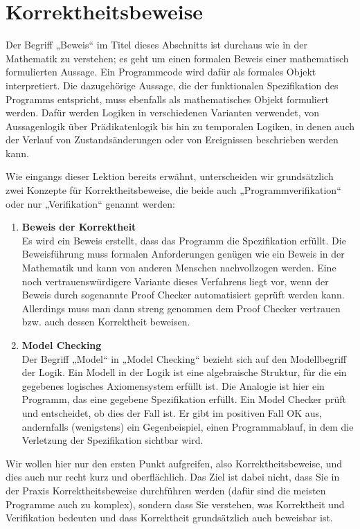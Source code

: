 \section{Korrektheitsbeweise}
\label{sec:Kap-11-2}

Der Begriff „Beweis“ im Titel dieses Abschnitts ist durchaus wie in der Mathematik zu verstehen; es geht um einen formalen Beweis einer mathematisch formulierten Aussage. Ein Programmcode wird dafür als formales Objekt interpretiert. Die dazugehörige Aussage, die der funktionalen Spezifikation des Programms entspricht, muss ebenfalls als mathematisches Objekt formuliert werden. Dafür werden Logiken in verschiedenen Varianten verwendet, von Aussagenlogik über Prädikatenlogik bis hin zu temporalen Logiken, in denen auch der Verlauf von Zustandsänderungen oder von Ereignissen beschrieben werden kann.

Wie eingangs dieser Lektion bereits erwähnt, unterscheiden wir grundsätzlich zwei Konzepte für Korrektheitsbeweise, die beide auch „Programmverifikation“ oder nur „Verifikation“ genannt werden:

\begin{enumerate}
	\item \textbf{Beweis der Korrektheit}\\
	Es wird ein Beweis erstellt, dass das Programm die Spezifikation erfüllt. Die Beweisführung muss formalen Anforderungen genügen wie ein Beweis in der Mathematik und kann von anderen Menschen nachvollzogen werden. Eine noch vertrauenswürdigere Variante dieses Verfahrens liegt vor, wenn der Beweis durch sogenannte Proof Checker automatisiert geprüft werden kann. Allerdings muss man dann streng genommen dem Proof Checker vertrauen bzw. auch dessen Korrektheit beweisen.
	
	\item \textbf{Model Checking}\\
	Der Begriff „Model“ in „Model Checking“ bezieht sich auf den Modellbegriff der Logik. Ein Modell in der Logik ist eine algebraische Struktur, für die ein gegebenes logisches Axiomensystem erfüllt ist. Die Analogie ist hier ein Programm, das eine gegebene Spezifikation erfüllt. Ein Model Checker prüft und entscheidet, ob dies der Fall ist. Er gibt im positiven Fall OK aus, andernfalls (wenigstens) ein Gegenbeispiel, \dasHeisst einen Programmablauf, in dem die Verletzung der Spezifikation sichtbar wird.
\end{enumerate}

Wir wollen hier nur den ersten Punkt aufgreifen, also Korrektheitsbeweise, und dies auch nur recht kurz und oberflächlich. Das Ziel ist dabei nicht, dass Sie in der Praxis Korrektheitsbeweise durchführen werden (dafür sind die meisten Programme auch zu komplex), sondern dass Sie verstehen, was Korrektheit und Verifikation bedeuten und dass Korrektheit grundsätzlich auch beweisbar ist.
